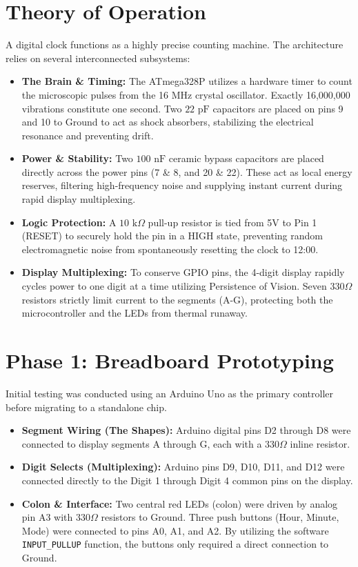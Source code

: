 \documentclass[12pt, a4paper]{report}
\begin{document}
\section{Theory of Operation}
A digital clock functions as a highly precise counting machine. The architecture relies on several interconnected subsystems:
\begin{itemize}
    \item \textbf{The Brain \& Timing:} The ATmega328P utilizes a hardware timer to count the microscopic pulses from the 16 MHz crystal oscillator. Exactly 16,000,000 vibrations constitute one second. Two $22\text{ pF}$ capacitors are placed on pins 9 and 10 to Ground to act as shock absorbers, stabilizing the electrical resonance and preventing drift.
    \item \textbf{Power \& Stability:} Two $100\text{ nF}$ ceramic bypass capacitors are placed directly across the power pins (7 \& 8, and 20 \& 22). These act as local energy reserves, filtering high-frequency noise and supplying instant current during rapid display multiplexing. 
    \item \textbf{Logic Protection:} A $10\text{ k}\Omega$ pull-up resistor is tied from 5V to Pin 1 (RESET) to securely hold the pin in a HIGH state, preventing random electromagnetic noise from spontaneously resetting the clock to 12:00.
    \item \textbf{Display Multiplexing:} To conserve GPIO pins, the 4-digit display rapidly cycles power to one digit at a time utilizing Persistence of Vision. Seven $330\Omega$ resistors strictly limit current to the segments (A-G), protecting both the microcontroller and the LEDs from thermal runaway.
\end{itemize}

\section{Phase 1: Breadboard Prototyping}
Initial testing was conducted using an Arduino Uno as the primary controller before migrating to a standalone chip.
\begin{itemize}
    \item \textbf{Segment Wiring (The Shapes):} Arduino digital pins D2 through D8 were connected to display segments A through G, each with a $330\Omega$ inline resistor.
    \item \textbf{Digit Selects (Multiplexing):} Arduino pins D9, D10, D11, and D12 were connected directly to the Digit 1 through Digit 4 common pins on the display.
    \item \textbf{Colon \& Interface:} Two central red LEDs (colon) were driven by analog pin A3 with $330\Omega$ resistors to Ground. Three push buttons (Hour, Minute, Mode) were connected to pins A0, A1, and A2. By utilizing the software \texttt{INPUT\_PULLUP} function, the buttons only required a direct connection to Ground.
\end{itemize}
\end{document}
